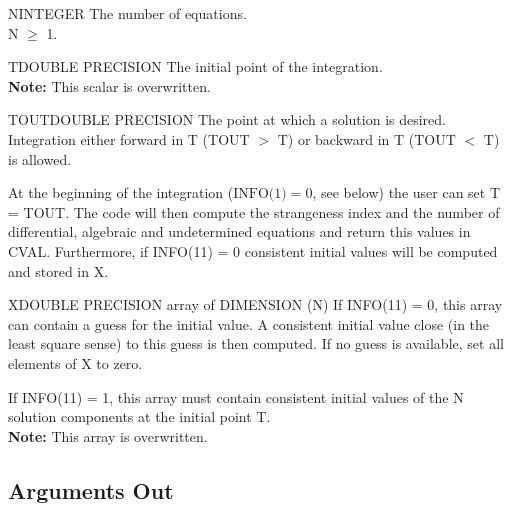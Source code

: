 \begin{entry}{N}{INTEGER}
  The number of equations.\\
  N $\ge$ 1.
\end{entry}
\begin{entry}{T}{DOUBLE PRECISION}
  The initial point of the integration.\\
  {\bf Note:} This scalar is overwritten.
\end{entry}
\begin{entry}{TOUT}{DOUBLE PRECISION}
  The point at which a solution is desired. Integration either forward
  in T (TOUT $>$ T) or backward in T (TOUT $<$ T) is allowed. 

  At the beginning of the integration ($\mbox{INFO(1)}=0$, see below)
  the user can set T = TOUT. The code will then compute the
  strangeness index and the number of differential, algebraic and
  undetermined equations and return this values in CVAL. Furthermore,
  if INFO(11) = 0 consistent initial values will be computed and
  stored in X. 
\end{entry}
\begin{entry}{X}{DOUBLE PRECISION array of DIMENSION (N)}
  If INFO(11) = 0, this array can contain a guess for the initial
  value. A consistent initial value close (in the least square sense)
  to this guess is then computed. If no guess is available, set all
  elements of X to zero.

  If INFO(11) = 1, this array must contain consistent initial values
  of the N solution components at the initial point T. \\
    {\bf Note:} This array is overwritten.
\end{entry}

\subsection{Arguments Out}

